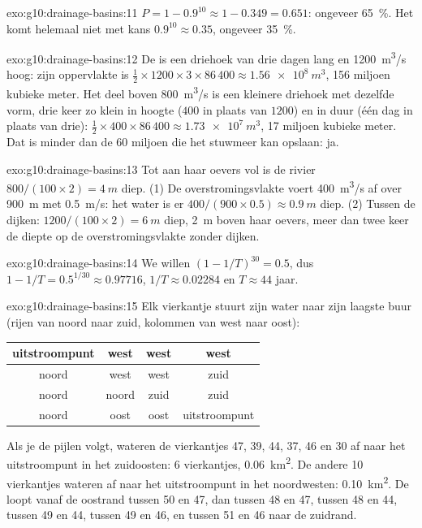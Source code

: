 \begin{solution}{exo:g10:drainage-basins:11}
$P = 1 - 0.9^{10} \approx 1 - 0.349 = 0.651$: ongeveer \qty{65}{\percent}. Het
komt helemaal niet met kans $0.9^{10} \approx 0.35$, ongeveer
\qty{35}{\percent}.
\end{solution}

\begin{solution}{exo:g10:drainage-basins:12}
De  is een driehoek van drie dagen lang en \qty{1200}{m^3/s} hoog: zijn
oppervlakte is $\tfrac12 \times 1200 \times 3 \times 86\,400 \approx
\qty{1.56e8}{m^3}$, \num{156} miljoen kubieke meter. Het deel boven
\qty{800}{m^3/s} is een kleinere driehoek met dezelfde vorm, drie keer zo
klein in hoogte ($400$ in plaats van $1200$) en in duur (één dag in plaats
van drie): $\tfrac12 \times 400 \times 86\,400 \approx \qty{1.73e7}{m^3}$,
\num{17} miljoen kubieke meter. Dat is minder dan de \num{60} miljoen die het
stuwmeer kan opslaan: ja.
\end{solution}

\begin{solution}{exo:g10:drainage-basins:13}
Tot aan haar oevers vol is de rivier $800/(100 \times 2) = \qty{4}{m}$ diep.
(1) De overstromingsvlakte voert \qty{400}{m^3/s} af over \qty{900}{m} met
\qty{0.5}{m/s}: het water is er $400/(900 \times 0.5) \approx \qty{0.9}{m}$ diep.
(2) Tussen de dijken: $1200/(100 \times 2) = \qty{6}{m}$ diep, \qty{2}{m}
boven haar oevers, meer dan twee keer de diepte op de overstromingsvlakte zonder
dijken.
\end{solution}

\begin{solution}{exo:g10:drainage-basins:14}
We willen $(1 - 1/T)^{30} = 0.5$, dus $1 - 1/T = 0.5^{1/30} \approx 0.97716$,
$1/T \approx 0.02284$ en $T \approx 44$ jaar.
\end{solution}

\begin{solution}{exo:g10:drainage-basins:15}
Elk vierkantje stuurt zijn water naar zijn laagste buur (rijen van noord naar
zuid, kolommen van west naar oost):
\begin{center}
\begin{tabular}{|c|c|c|c|}
\hline
uitstroompunt & west & west & west \\ \hline
noord & west & west & zuid \\ \hline
noord & noord & zuid & zuid \\ \hline
noord & oost & oost & uitstroompunt \\ \hline
\end{tabular}
\end{center}
Als je de pijlen volgt, wateren de vierkantjes 47, 39, 44, 37, 46 en 30 af naar
het uitstroompunt in het zuidoosten: 6 vierkantjes, \qty{0.06}{km^2}. De andere 10
vierkantjes wateren af naar het uitstroompunt in het noordwesten:
\qty{0.10}{km^2}. De  loopt vanaf de oostrand tussen 50 en 47,
dan tussen 48 en 47, tussen 48 en 44, tussen 49 en 44, tussen 49 en 46, en tussen
51 en 46 naar de zuidrand.
\end{solution}

